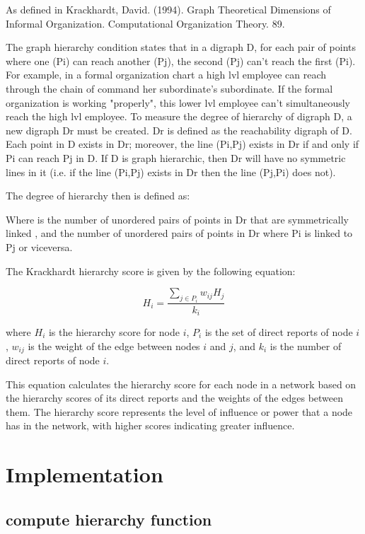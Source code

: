 As defined in Krackhardt, David. (1994). Graph Theoretical Dimensions of Informal Organization. Computational Organization Theory. 89.

The graph hierarchy condition states that in a digraph D, for each pair of points where one (Pi) can reach another (Pj), the second (Pj) can't reach the first (Pi). 
For example, in a formal organization chart a high lvl employee can reach through the chain of command her subordinate's subordinate. If the formal organization is working "properly", this lower lvl employee can't simultaneously reach the high lvl employee.
To measure the degree of hierarchy of digraph D, a new digraph Dr must be created. Dr is defined as the reachability digraph of D. Each point in D exists in Dr; moreover, the line (Pi,Pj) exists in Dr if and only if Pi can reach Pj in D. If D is graph hierarchic, then Dr will have no symmetric lines in it (i.e. if the line (Pi,Pj) exists in Dr then the line (Pj,Pi) does not).

The degree of hierarchy then is defined as:

Where is the number of unordered pairs of points in Dr that are symmetrically linked , and the number of unordered pairs of points in Dr where Pi is linked to Pj or viceversa.


The Krackhardt hierarchy score is given by the following equation:

\begin{equation}
H_i = \frac{\sum_{j \in P_i} w_{ij} H_j}{k_i}
\end{equation}

where $H_i$ is the hierarchy score for node $i$, $P_i$ is the set of direct reports of node $i$, $w_{ij}$ is the weight of the edge between nodes $i$ and $j$, and $k_i$ is the number of direct reports of node $i$.

This equation calculates the hierarchy score for each node in a network based on the hierarchy scores of its direct reports and the weights of the edges between them. The hierarchy score represents the level of influence or power that a node has in the network, with higher scores indicating greater influence.





\section{Implementation}

\subsection{compute hierarchy function}


